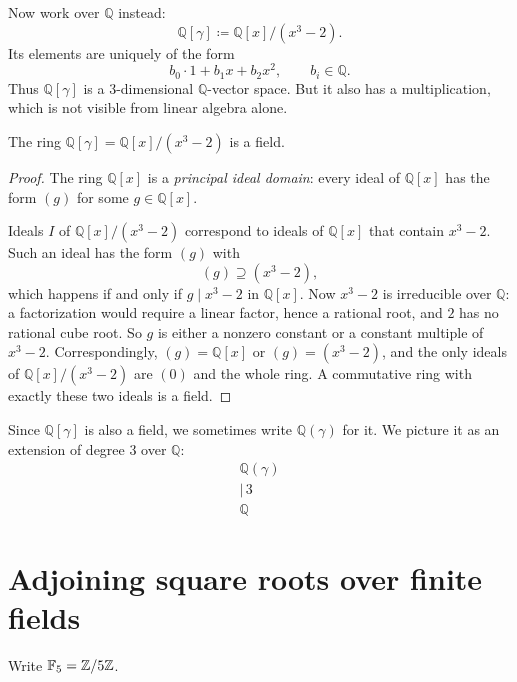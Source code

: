 \documentclass[reqno,11pt]{amsart}
\newcommand{\Q}{\mathbb{Q}}
\newcommand{\F}{\mathbb{F}}
\begin{document}
\begin{example}[The field $\Q(\gamma)$]
Now work over $\Q$ instead:
\[
  \Q[\gamma]\coloneqq\Q[x]/(x^3-2).
\]
Its elements are uniquely of the form
\[
  b_0\cdot1+b_1x+b_2x^2,\qquad b_i\in\Q .
\]
Thus $\Q[\gamma]$ is a $3$-dimensional $\Q$-vector space. But it also
has a multiplication, which is not visible from linear algebra alone.
\end{example}

\begin{proposition}\label{prop:Q-gamma-field}
The ring $\Q[\gamma]=\Q[x]/(x^3-2)$ is a field.
\end{proposition}
\begin{proof}
The ring $\Q[x]$ is a \emph{principal ideal domain}: every ideal of
$\Q[x]$ has the form $(g)$ for some $g\in\Q[x]$.

Ideals $I$ of $\Q[x]/(x^3-2)$ correspond to ideals of $\Q[x]$ that
contain $x^3-2$. Such an ideal has the form $(g)$ with
\[
  (g)\supseteq(x^3-2),
\]
which happens if and only if $g\mid x^3-2$ in $\Q[x]$.
Now $x^3-2$ is irreducible over $\Q$: a factorization would require a
linear factor, hence a rational root, and $2$ has no rational cube
root. So $g$ is either a nonzero constant or a constant multiple of
$x^3-2$. Correspondingly, $(g)=\Q[x]$ or $(g)=(x^3-2)$, and the only
ideals of $\Q[x]/(x^3-2)$ are $(0)$ and the whole ring. A commutative
ring with exactly these two ideals is a field.
\end{proof}

Since $\Q[\gamma]$ is also a field, we sometimes write $\Q(\gamma)$ for
it. We picture it as an extension of degree $3$ over $\Q$:
\[
  \begin{array}{c}
    \Q(\gamma)\\
    \big|\,{\scriptstyle 3}\\
    \Q
  \end{array}
\]

\section{Adjoining square roots over finite fields}

Write $\F_5=\Z/5\Z$.
\end{document}

